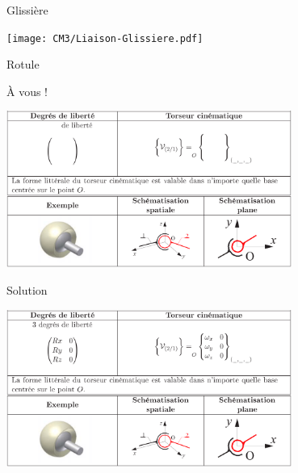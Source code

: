 \documentclass[
  ignorenonframetext,
  aspectratio=169,
  c]{beamer}
\begin{document}
\begin{frame}{Glissière}
\label{glissiuxe8re}
\begin{center}
\texttt{[image: CM3/Liaison-Glissiere.pdf]}
\end{center}
\end{frame}

\begin{frame}{Rotule}
\label{rotule}
\begin{block}{À vous !}
\begin{center}
\includegraphics[width=0.7\textwidth,height=\textheight]{CM3/Liaison-rotule-00.png}
\end{center}
\end{block}

\begin{block}{Solution}
\begin{center}
\includegraphics[width=0.7\textwidth,height=\textheight]{CM3/Liaison-rotule-01.png}
\end{center}
\end{block}
\end{frame}
\end{document}

